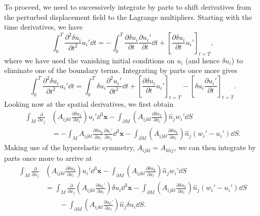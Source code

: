 To proceed, we need to successively integrate by parts to shift derivatives from the perturbed 
displacement field to the Lagrange multipliers. Starting with the time derivatives, we have
\begin{equation}
\int_{0}^{T}\frac{\partial^{2}\delta u_{i}}{\partial t^{2}}u_{i}'\dd t = -\int_{0}^{T}\frac{\partial\delta u_{i}}{\partial t}\frac{\partial u_{i}'}{\partial t}\dd t+\left[\frac{\partial\delta u_{i}}{\partial t}u_{i}'\right]_{t=T},
\label{eq:21}
\end{equation}
where we have used the vanishing initial conditions on $u_{i}$ (and hence $\delta u_{i}$) to eliminate one 
of the boundary terms. Integrating by parts once more gives
\begin{equation}
\int_{0}^{T}\frac{\partial^{2}\delta u_{i}}{\partial t^{2}}u_{i}'\dd t = \int_{0}^{T}\delta u_{i}\frac{\partial^{2}u_{i}'}{\partial t^{2}}\dd t+\left[\frac{\partial\delta u_{i}}{\partial t}u_{i}'\right]_{t=T}-\left[\delta u_{i}\frac{\partial u_{i}'}{\partial t}\right]_{t=T}.
\label{eq:22}
\end{equation}
Looking now at the spatial derivatives, we first obtain
\begin{align}
\int_{M}\frac{\partial}{\partial x_{j}}&\left(A_{ijkl}\frac{\partial\delta u_{k}}{\partial x_{l}}\right)u_{i}'\dd^{3}\mathbf{x} - \int_{\partial M}\left(A_{ijkl}\frac{\partial\delta u_{k}}{\partial x_{l}}\right)\hat{n}_{j}w_{i}'\dd S \nonumber \\
&= -\int_{M}A_{ijkl}\frac{\partial\delta u_{k}}{\partial x_{l}}\frac{\partial u_{i}'}{\partial x_{j}}\dd^{3}\mathbf{x} - \int_{\partial M}\left(A_{ijkl}\frac{\partial\delta u_{k}}{\partial x_{l}}\right)\hat{n}_{j}(w_{i}'-u_{i}')\dd S.
\label{eq:23}
\end{align}
Making use of the hyperelastic symmetry, $A_{ijkl}=A_{klij}$, we can then integrate by parts once more to arrive at
\begin{align}
\int_{M}\frac{\partial}{\partial x_{j}}&\left(A_{ijkl}\frac{\partial\delta u_{k}}{\partial x_{l}}\right)u_{i}'\dd^{3}\mathbf{x} - \int_{\partial M}\left(A_{ijkl}\frac{\partial\delta u_{k}}{\partial x_{l}}\right)\hat{n}_{j}w_{i}'\dd S \nonumber \\
&= \int_{M}\frac{\partial}{\partial x_{j}}\left(A_{ijkl}\frac{\partial u_{k}'}{\partial x_{l}}\right)\delta u_{i}\dd^{3}\mathbf{x} - \int_{\partial M}\left(A_{ijkl}\frac{\partial\delta u_{k}}{\partial x_{l}}\right)\hat{n}_{j}(w_{i}'-u_{i}')\dd S \nonumber \\
& \qquad -\int_{\partial M}\left(A_{ijkl}\frac{\partial u_{k}'}{\partial x_{l}}\right)\hat{n}_{j}\delta u_{i}\dd S.
\label{eq:24}
\end{align}



